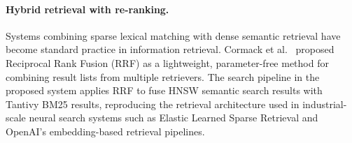 \paragraph{Hybrid retrieval with re-ranking.}
Systems combining sparse lexical matching with dense semantic retrieval have become standard practice in information retrieval.
Cormack et al.~\cite{cormack2009rrf} proposed Reciprocal Rank Fusion (RRF) as a lightweight, parameter-free method for combining result lists from multiple retrievers.
The search pipeline in the proposed system applies RRF to fuse HNSW semantic search results with Tantivy BM25 results, reproducing the retrieval architecture used in industrial-scale neural search systems such as Elastic Learned Sparse Retrieval and OpenAI's embedding-based retrieval pipelines.
